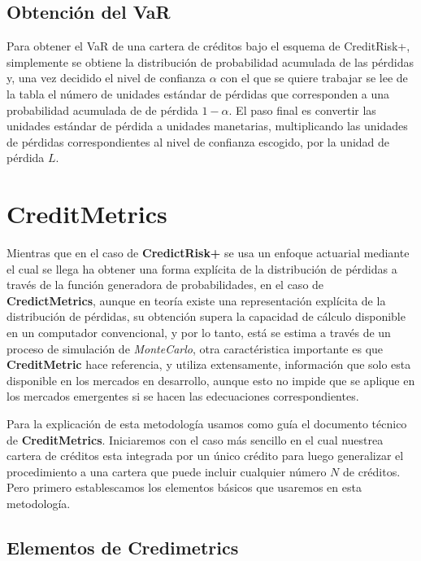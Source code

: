 \documentclass[
  12pt,
]{krantz}
\theoremstyle{definition}
\theoremstyle{definition}
\theoremstyle{definition}
\theoremstyle{remark}
\begin{document}
\hypertarget{obtencion-del-var}{%
\section{Obtención del VaR}\label{obtencion-del-var}}

Para obtener el VaR de una cartera de créditos bajo el esquema de CreditRisk+, simplemente se obtiene la distribución
de probabilidad acumulada de las pérdidas y, una vez decidido el nivel de confianza \(\alpha\) con el que se quiere trabajar se lee de la tabla el número de unidades estándar de pérdidas que corresponden a una probabilidad acumulada de de pérdida \(1-\alpha\). El paso final es convertir las unidades estándar de pérdida a unidades manetarias, multiplicando las unidades de pérdidas correspondientes al nivel de confianza escogido, por la unidad de pérdida \(L\).

\mainmatter

\hypertarget{creditmetrics}{%
\chapter{CreditMetrics}\label{creditmetrics}}

Mientras que en el caso de \textbf{CredictRisk+} se usa un enfoque actuarial mediante el cual se llega ha obtener una forma explícita de la distribución de pérdidas a través de la función generadora de probabilidades, en el caso de \textbf{CredictMetrics}, aunque en teoría existe una representación explícita de la distribución de pérdidas, su obtención supera la capacidad de cálculo disponible en un computador convencional, y por lo tanto, está se estima a través de un proceso de simulación de \emph{MonteCarlo}, otra caractéristica importante es que \textbf{CreditMetric} hace referencia, y utiliza extensamente, información que solo esta disponible en los mercados en desarrollo, aunque esto no impide que se aplique en los mercados emergentes si se hacen las edecuaciones correspondientes.

Para la explicación de esta metodología usamos como guía el documento técnico de \textbf{CreditMetrics}. Iniciaremos con el caso más sencillo en el cual nuestrea cartera de créditos esta integrada por un único crédito para luego generalizar el procedimiento a una cartera que puede incluir cualquier número \(N\) de créditos. Pero primero establescamos los elementos básicos que usaremos en esta metodología.

\hypertarget{elementos-de-credimetrics}{%
\section{\texorpdfstring{Elementos de \textbf{Credimetrics}}{Elementos de Credimetrics}}\label{elementos-de-credimetrics}}
\end{document}
